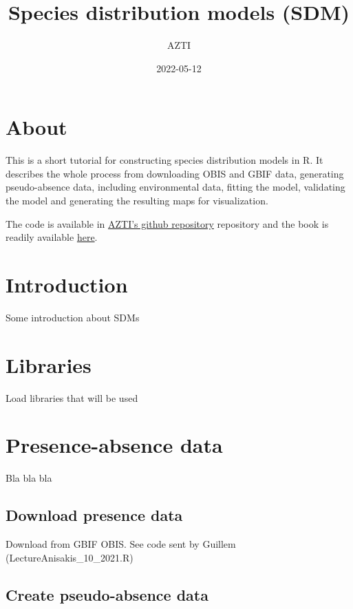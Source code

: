 \documentclass[
]{book}
\title{Species distribution models (SDM)}
\author{AZTI}
\date{2022-05-12}
\begin{document}
\maketitle

{
\setcounter{tocdepth}{1}
\tableofcontents
}
\hypertarget{about}{%
\chapter{About}\label{about}}

This is a short tutorial for constructing species distribution models in R. It describes the whole process from downloading OBIS and GBIF data, generating pseudo-absence data, including environmental data, fitting the model, validating the model and generating the resulting maps for visualization.

The code is available in \href{https://github.com/Fundacion-AZTI/SDM}{AZTI's github repository} repository and the book is readily available \href{https://fundacion-azti.github.io/SDM/}{here}.

\hypertarget{introduction}{%
\chapter{Introduction}\label{introduction}}

Some introduction about SDMs

\hypertarget{libraries}{%
\chapter{Libraries}\label{libraries}}

Load libraries that will be used

\hypertarget{presence-absence-data}{%
\chapter{Presence-absence data}\label{presence-absence-data}}

Bla bla bla

\hypertarget{download-presence-data}{%
\section{Download presence data}\label{download-presence-data}}

Download from GBIF OBIS. See code sent by Guillem (LectureAnisakis\_10\_2021.R)

\hypertarget{create-pseudo-absence-data}{%
\section{Create pseudo-absence data}\label{create-pseudo-absence-data}}
\end{document}
